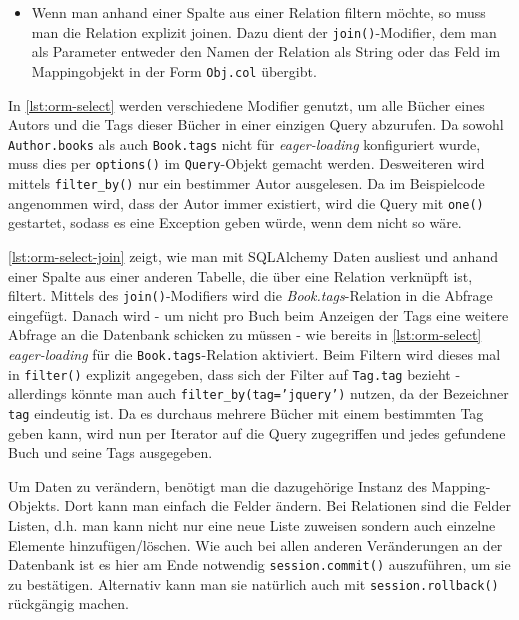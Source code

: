 \begin{itemize}
\item Wenn man anhand einer Spalte aus einer Relation filtern möchte, so muss
man die Relation explizit joinen. Dazu dient der \texttt{join()}-Modifier, dem
man als Parameter entweder den Namen der Relation als String oder das Feld im
Mappingobjekt in der Form \texttt{Obj.col} übergibt.

\end{itemize}

In \autoref{lst:orm-select} werden verschiedene Modifier genutzt, um alle Bücher
eines Autors und die Tags dieser Bücher in einer einzigen Query abzurufen. Da
sowohl \texttt{Author.books} als auch \texttt{Book.tags} nicht für
\emph{eager-loading} konfiguriert wurde, muss dies per \texttt{options()} im
\texttt{Query}-Objekt gemacht werden. Desweiteren wird mittels
\texttt{filter\_by()} nur ein bestimmer Autor ausgelesen. Da im Beispielcode
angenommen wird, dass der Autor immer existiert, wird die Query mit
\texttt{one()} gestartet, sodass es eine Exception geben würde, wenn dem nicht
so wäre.



\autoref{lst:orm-select-join} zeigt, wie man mit SQLAlchemy Daten ausliest und
anhand einer Spalte aus einer anderen Tabelle, die über eine Relation verknüpft
ist, filtert. Mittels des \texttt{join()}-Modifiers wird die
\emph{Book.tags}-Relation in die Abfrage eingefügt. Danach wird - um nicht pro
Buch beim Anzeigen der Tags eine weitere Abfrage an die Datenbank schicken zu
müssen - wie bereits in \autoref{lst:orm-select} \emph{eager-loading} für die
\texttt{Book.tags}-Relation aktiviert. Beim Filtern wird dieses mal in
\texttt{filter()} explizit angegeben, dass sich der Filter auf \texttt{Tag.tag}
bezieht - allerdings könnte man auch \texttt{filter\_by(tag='jquery')} nutzen,
da der Bezeichner \texttt{tag} eindeutig ist. Da es durchaus mehrere Bücher mit
einem bestimmten Tag geben kann, wird nun per Iterator auf die Query zugegriffen
und jedes gefundene Buch und seine Tags ausgegeben.



Um Daten zu verändern, benötigt man die dazugehörige Instanz des
Mapping-Objekts. Dort kann man einfach die Felder ändern. Bei Relationen sind
die Felder Listen, d.h. man kann nicht nur eine neue Liste zuweisen sondern auch
einzelne Elemente hinzufügen/löschen. Wie auch bei allen anderen Veränderungen
an der Datenbank ist es hier am Ende notwendig \texttt{session.commit()}
auszuführen, um sie zu bestätigen. Alternativ kann man sie natürlich auch mit
\texttt{session.rollback()} rückgängig machen.

